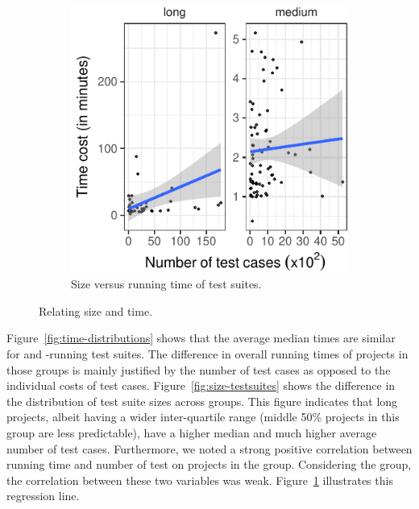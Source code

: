 \begin{figure}[t]
\begin{subfigure}{0.3\textwidth}
    \includegraphics[width=.95\textwidth]{results/scatter-testcost.pdf}
    \caption{\label{fig:scattercost}Size versus running time of
      test suites.}
  \end{subfigure}
  \caption{\label{fig:time-versus-size}Relating size and time.}%
\end{figure}


Figure~\ref{fig:time-distributions} shows that the average median
times are similar for \medg{} and \longg{}-running test suites.
The difference in overall running times of projects in those groups
is mainly justified by the number of test cases as opposed to the
individual costs of test cases.
Figure~\ref{fig:size-testsuites} shows the difference in the
distribution of test suite sizes across groups.  This figure indicates
that long projects, albeit having a wider inter-quartile range (middle
50\% projects in this group are less predictable), have a higher
median and much higher average number of test cases.  Furthermore, we
noted a strong positive correlation between running time and number of
test on projects in the \longg{} group.  Considering the \medg{}
group, the correlation between these two variables was weak.
Figure~\ref{fig:scattercost} illustrates this regression line.



